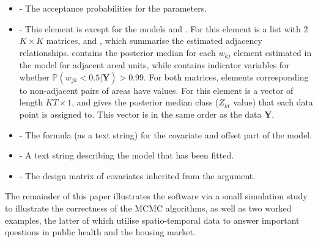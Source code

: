 \documentclass[article, nojss]{jss}
\begin{document}
\begin{itemize}
\item {} - The acceptance probabilities for the parameters.

\item {} - This element is  except for the models  and . For  this element is a list with 2 $K \times K$ matrices,  and , which summarise the estimated adjacency relationships.  contains the posterior median for each $w_{kj}$ element estimated in the model for adjacent areal units, while  contains indicator variables for whether $\mathbb{P}(w_{jk} < 0.5|\mathbf{Y})>0.99$. For both matrices, elements corresponding to non-adjacent pairs of areas have  values. For  this element is a vector of length $KT\times 1$, and gives the posterior median class ($Z_{kt}$ value) that each data point is assigned to. This vector is in the same order as the data $\mathbf{Y}$.
        
\item {} - The formula (as a text string) for the covariate and offset part of the model.

\item {} - A text string describing the model that has been fitted.

\item {} - The design matrix of covariates inherited from the  argument.
\end{itemize}



The remainder of this paper illustrates the  software via a small simulation study to illustrate the correctness of the MCMC algorithms, as well as  two worked examples, the latter of which utilise spatio-temporal data to answer important questions in public health and the housing market.


\end{document}
